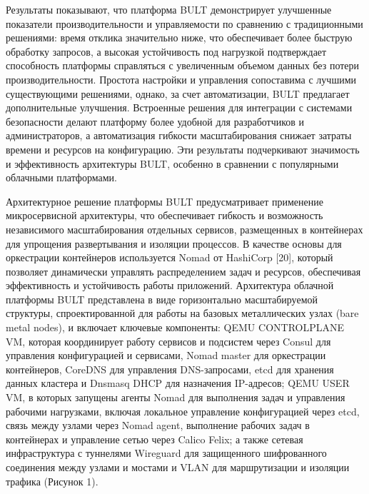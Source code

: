 {%

Результаты показывают, что платформа BULT демонстрирует улучшенные
показатели производительности и управляемости по сравнению с
традиционными решениями: время отклика значительно ниже, что
обеспечивает более быструю обработку запросов, а высокая устойчивость
под нагрузкой подтверждает способность платформы справляться с
увеличенным объемом данных без потери производительности. Простота
настройки и управления сопоставима с лучшими существующими решениями,
однако, за счет автоматизации, BULT предлагает дополнительные улучшения.
Встроенные решения для интеграции с системами безопасности делают
платформу более удобной для разработчиков и администраторов, а
автоматизация гибкости масштабирования снижает затраты времени и
ресурсов на конфигурацию. Эти результаты подчеркивают значимость и
эффективность архитектуры BULT, особенно в сравнении с популярными
облачными платформами.

Архитектурное решение платформы BULT предусматривает применение
микросервисной архитектуры, что обеспечивает гибкость и возможность
независимого масштабирования отдельных сервисов, размещенных в
контейнерах для упрощения развертывания и изоляции процессов. В качестве
основы для оркестрации контейнеров используется Nomad от HashiCorp
{[}20{]}, который позволяет динамически управлять распределением задач и
ресурсов, обеспечивая эффективность и устойчивость работы приложений.
Архитектура облачной платформы BULT представлена в виде горизонтально
масштабируемой структуры, спроектированной для работы на базовых
металлических узлах (bare metal nodes), и включает ключевые компоненты:
QEMU CONTROLPLANE VM, которая координирует работу сервисов и подсистем
через Consul для управления конфигурацией и сервисами, Nomad master для
оркестрации контейнеров, CoreDNS для управления DNS-запросами, etcd для
хранения данных кластера и Dnsmasq DHCP для назначения IP-адресов; QEMU
USER VM, в которых запущены агенты Nomad для выполнения задач и
управления рабочими нагрузками, включая локальное управление
конфигурацией через etcd, связь между узлами через Nomad agent,
выполнение рабочих задач в контейнерах и управление сетью через Calico
Felix; а также сетевая инфраструктура с туннелями Wireguard для
защищенного шифрованного соединения между узлами и мостами и VLAN для
маршрутизации и изоляции трафика (Рисунок 1).

}
